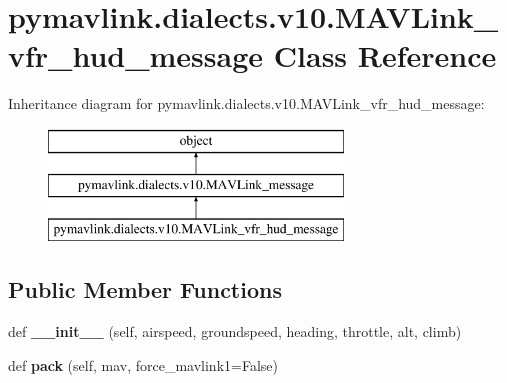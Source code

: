 \hypertarget{classpymavlink_1_1dialects_1_1v10_1_1MAVLink__vfr__hud__message}{}\section{pymavlink.\+dialects.\+v10.\+M\+A\+V\+Link\+\_\+vfr\+\_\+hud\+\_\+message Class Reference}
\label{classpymavlink_1_1dialects_1_1v10_1_1MAVLink__vfr__hud__message}
Inheritance diagram for pymavlink.\+dialects.\+v10.\+M\+A\+V\+Link\+\_\+vfr\+\_\+hud\+\_\+message\+:\begin{figure}[H]
\begin{center}
\leavevmode
\includegraphics[height=3.000000cm]{classpymavlink_1_1dialects_1_1v10_1_1MAVLink__vfr__hud__message}
\end{center}
\end{figure}
\subsection*{Public Member Functions}
\begin{DoxyCompactItemize}
\item 
\mbox{\label{classpymavlink_1_1dialects_1_1v10_1_1MAVLink__vfr__hud__message_aff1ad441c82d55dd0e52c3885a56a5f0}} 
def {\bfseries \+\_\+\+\_\+init\+\_\+\+\_\+} (self, airspeed, groundspeed, heading, throttle, alt, climb)
\item 
\mbox{\label{classpymavlink_1_1dialects_1_1v10_1_1MAVLink__vfr__hud__message_ab7a759078e741c178b747f5e95bf59a6}} 
def {\bfseries pack} (self, mav, force\+\_\+mavlink1=False)
\end{DoxyCompactItemize}
